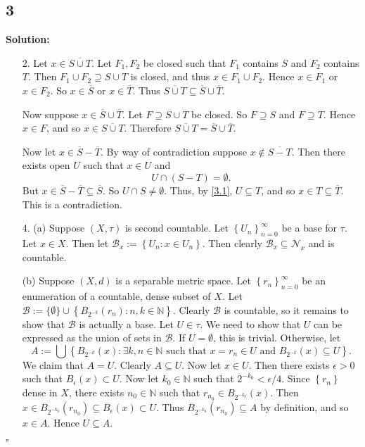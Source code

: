 \documentclass[12pt]{article}
\newcounter{ProofCounter}
\newenvironment{Solution}{\stepcounter{ProofCounter}\textbf{Solution:}}{\hfill$\square$}
\begin{document}
\subsection*{3}
\begin{Solution}
  \begin{enumerate}
    \item[2.] Let $x \in \overline{S\cup T}$. Let $F_1, F_2$ be closed such that $F_1$ contains $S$ and $F_2$ contains $T$. Then $F_1 \cup F_2
      \supseteq S\cup T$ is closed, and thus $x \in F_1 \cup F_2$. Hence $x \in F_1$ or $x \in F_2$. So $x \in \overline{S}$ or $x \in \overline{T}$. Thus 
      $\overline{S\cup T} \subseteq \overline{S} \cup \overline{T}$.

      Now suppose $x \in \overline{S} \cup \overline{T}$. Let $F \supseteq S\cup T$ be closed. So $F \supseteq S$ and $F \supseteq T$. Hence $x \in
      F$, and so $x \in \overline{S\cup T}$. Therefore $\overline{S\cup T} = \overline{S} \cup \overline{T}$.

      Now let $x \in \overline{S} - \overline{T}$. By way of contradiction suppose $x \notin \overline{S - T}$. Then there exists open $U$ such that
      $x \in U$ and
      \begin{equation}
        U \cap (S - T) = \emptyset.
        \label{3.1}
      \end{equation}
      But $x \in \overline{S} - \overline{T} \subseteq \overline{S}$. So $U \cap S \neq \emptyset$. Thus, by \eqref{3.1}, $U \subseteq T$, and so $x
      \in T \subseteq \overline{T}$. This is a contradiction.

    \item[4.] (a) Suppose $(X, \tau)$ is second countable. Let $\left\{ U_n \right\}_{n=0}^{\infty}$ be a base for $\tau$. Let $x \in X$. Then let
      $\mathcal{B}_{x} := \left\{ U_{n} : x \in U_n \right\}$. Then clearly $\mathcal{B}_x \subseteq \mathcal{N}_{x}$ and is countable.

      (b) Suppose $(X, d)$ is a separable metric space. Let $\left\{ r_n \right\}_{n=0}^{\infty}$ be an enumeration of a countable, dense subset of
      $X$. Let $\mathcal{B} := \{\emptyset\} \cup \left\{ B_{2^{-k}}(r_n) : n, k \in \mathbb{N} \right\}$. Clearly $\mathcal{B}$ is countable, so it remains to show that
      $\mathcal{B}$ is actually a base. Let $U \in \tau$. We need to show that $U$ can be expressed as the union of sets in $\mathcal{B}$. If $U =
      \emptyset$, this is trivial. Otherwise, let
      \[
        A := \bigcup \left\{ B_{2^{-k}}(x) : \exists k, n \in \mathbb{N} \text{ such that } x  = r_n \in U \text{ and } B_{2^{-k}}(x) \subseteq
        U\right\}.
      \]
      We claim that $A = U$. Clearly $A \subseteq U$. Now let $x \in U$. Then there exists $\epsilon > 0$ such that $B_{\epsilon}(x) \subset U$.
      Now let $k_{0} \in \mathbb{N}$ such that $2^{-k_0} < \epsilon / 4$.
      Since $\left\{ r_n \right\}$ dense in $X$, there exists $n_0 \in \mathbb{N}$ such that $r_{n_0} \in B_{2^{-k_0}}(x)$.
      Then $x \in B_{2^{-k_0}}(r_{n_0}) \subseteq B_{\epsilon}(x) \subset U$. Thus $B_{2^{-k_0}}(r_{n_0}) \subseteq A$ by definition, and so $x \in
      A$. Hence $U \subseteq A$.


\end{enumerate}
\end{Solution}
\end{document}
